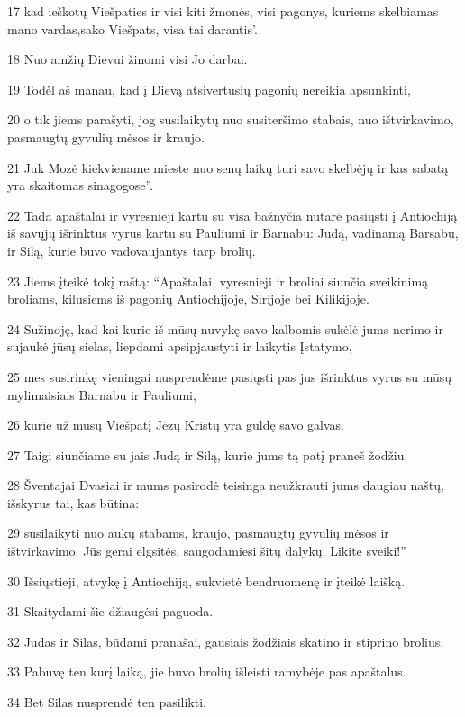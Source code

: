 \par 17 kad ieškotų Viešpaties ir visi kiti žmonės, visi pagonys, kuriems skelbiamas mano vardas,­sako Viešpats, visa tai darantis’. 
\par 18 Nuo amžių Dievui žinomi visi Jo darbai. 
\par 19 Todėl aš manau, kad į Dievą atsivertusių pagonių nereikia apsunkinti, 
\par 20 o tik jiems parašyti, jog susilaikytų nuo susiteršimo stabais, nuo ištvirkavimo, pasmaugtų gyvulių mėsos ir kraujo. 
\par 21 Juk Mozė kiekviename mieste nuo senų laikų turi savo skelbėjų ir kas sabatą yra skaitomas sinagogose”. 
\par 22 Tada apaštalai ir vyresnieji kartu su visa bažnyčia nutarė pasiųsti į Antiochiją iš savųjų išrinktus vyrus kartu su Pauliumi ir Barnabu: Judą, vadinamą Barsabu, ir Silą, kurie buvo vadovaujantys tarp brolių. 
\par 23 Jiems įteikė tokį raštą: “Apaštalai, vyresnieji ir broliai siunčia sveikinimą broliams, kilusiems iš pagonių Antiochijoje, Sirijoje bei Kilikijoje. 
\par 24 Sužinoję, kad kai kurie iš mūsų nuvykę savo kalbomis sukėlė jums nerimo ir sujaukė jūsų sielas, liepdami apsipjaustyti ir laikytis Įstatymo, 
\par 25 mes susirinkę vieningai nusprendėme pasiųsti pas jus išrinktus vyrus su mūsų mylimaisiais Barnabu ir Pauliumi, 
\par 26 kurie už mūsų Viešpatį Jėzų Kristų yra guldę savo galvas. 
\par 27 Taigi siunčiame su jais Judą ir Silą, kurie jums tą patį praneš žodžiu. 
\par 28 Šventajai Dvasiai ir mums pasirodė teisinga neužkrauti jums daugiau naštų, išskyrus tai, kas būtina: 
\par 29 susilaikyti nuo aukų stabams, kraujo, pasmaugtų gyvulių mėsos ir ištvirkavimo. Jūs gerai elgsitės, saugodamiesi šitų dalykų. Likite sveiki!” 
\par 30 Išsiųstieji, atvykę į Antiochiją, sukvietė bendruomenę ir įteikė laišką. 
\par 31 Skaitydami šie džiaugėsi paguoda. 
\par 32 Judas ir Silas, būdami pranašai, gausiais žodžiais skatino ir stiprino brolius. 
\par 33 Pabuvę ten kurį laiką, jie buvo brolių išleisti ramybėje pas apaštalus. 
\par 34 Bet Silas nusprendė ten pasilikti. 
